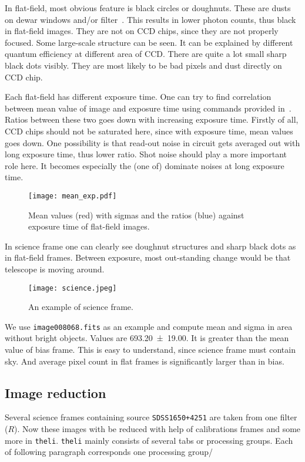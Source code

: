 In flat-field, most obvious feature is black circles or doughnuts. These are dusts on dewar windows and/or filter~\cite{manual}. This results in lower photon counts, thus black in flat-field images. They are not on CCD chips, since they are not properly focused. Some large-scale structure can be seen. It can be explained by different quantum efficiency at different area of CCD. There are quite a lot small sharp black dots visibly. They are most likely to be bad pixels and dust directly on CCD chip.

Each flat-field has different exposure time. One can try to find correlation between mean value of image and exposure time using commands provided in~\cite{manual}. Ratios between these two goes down with increasing exposure time. Firstly of all, CCD chips should not be saturated here, since with exposure time, mean values goes down. One possibility is that read-out noise in circuit gets averaged out with long exposure time, thus lower ratio. Shot noise should play a more important role here. It becomes especially the (one of) dominate noises at long exposure time.
\begin{figure}[H]
   \centering
   \texttt{[image: mean\_exp.pdf]}
   \caption{Mean values (red) with sigmas and the ratios (blue) against exposure time of flat-field images.}%
\end{figure}

In science frame one can clearly see doughnut structures and sharp black dots as in flat-field frames. Between exposure, most out-standing change would be that telescope is moving around. 
\begin{figure}[H]
   \centering
   \texttt{[image: science.jpeg]}
   \caption{An example of science frame.}%
   \label{fig:science}
\end{figure}

We use \verb|image008068.fits| as an example and compute mean and sigma in area without bright objects. Values are \num{693.20 +- 19.00}. It is greater than the mean value of bias frame. This is easy to understand, since science frame must contain sky. And average pixel count in flat frames is significantly larger than in bias.

\subsection{Image reduction}
Several science frames containing source \verb|SDSS1650+4251|  are taken from one filter ($R$). Now these images with be reduced with help of calibrations frames and some more in \verb|theli|. \verb|theli| mainly consists of several tabs or processing groups. Each of following paragraph corresponds one processing group/

